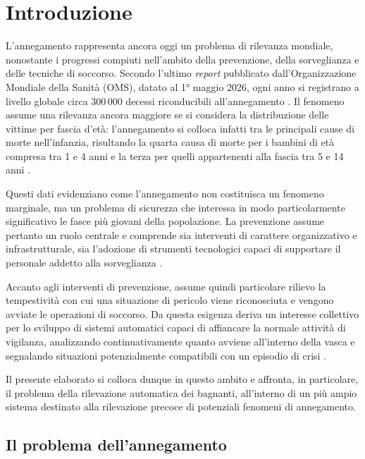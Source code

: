 \chapter{Introduzione}

L'annegamento rappresenta ancora oggi un problema di rilevanza mondiale, nonostante i progressi compiuti nell'ambito della prevenzione, della sorveglianza e delle tecniche di soccorso. Secondo l'ultimo \emph{report} pubblicato dall'Organizzazione Mondiale della Sanità (OMS), datato al 1° maggio 2026, ogni anno si registrano a livello globale circa 300\,000 decessi riconducibili all'annegamento \cite{WHO2026Drowning}. Il fenomeno assume una rilevanza ancora maggiore se si considera la distribuzione delle vittime per fascia d'età: l'annegamento si colloca infatti tra le principali cause di morte nell'infanzia, risultando la quarta causa di morte per i bambini di età compresa tra 1 e 4 anni e la terza per quelli appartenenti alla fascia tra 5 e 14 anni \cite{WHO2026Drowning}.

Questi dati evidenziano come l'annegamento non costituisca un fenomeno marginale, ma un problema di sicurezza che interessa in modo particolarmente significativo le fasce più giovani della popolazione. La prevenzione assume pertanto un ruolo centrale e comprende sia interventi di carattere organizzativo e infrastrutturale, sia l'adozione di strumenti tecnologici capaci di supportare il personale addetto alla sorveglianza \cite{WHO2026Drowning,UNI20380}.

Accanto agli interventi di prevenzione, assume quindi particolare rilievo la tempestività con cui una situazione di pericolo viene riconosciuta e vengono avviate le operazioni di soccorso. Da questa esigenza deriva un interesse collettivo per lo sviluppo di sistemi automatici capaci di affiancare la normale attività di vigilanza, analizzando continuativamente quanto avviene all'interno della vasca e segnalando situazioni potenzialmente compatibili con un episodio di crisi \cite{Eng2008DEWS,UNI20380}.

Il presente elaborato si colloca dunque in questo ambito e affronta, in particolare, il problema della rilevazione automatica dei bagnanti, all'interno di un più ampio sistema destinato alla rilevazione precoce di potenziali fenomeni di annegamento.

\section{Il problema dell'annegamento}

